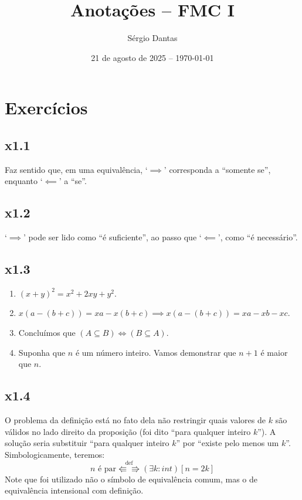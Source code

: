 \documentclass[portuguese,a4paper,12pt]{article}
\newcommand{\intiff}{\Lleftarrow\!\Rrightarrow}
\newcommand{\intdefiff}{\overset{\mathrm{def}}{\intiff}}
\begin{document}
	\title{Anotações -- FMC I}
	\author{Sérgio Dantas}
	\date{21 de agosto de 2025 -- \today}
	\maketitle
	
	\section*{\centering Exercícios}
	
	\subsection*{x1.1}
	
	Faz sentido que, em uma equivalência, `$\implies$' corresponda a ``somente se'', enquanto `$\impliedby$' a ``se''.
	 
	\subsection*{x1.2}
	
	`$\implies$' pode ser lido como ``é suficiente'', ao passo que `$\impliedby$', como ``é necessário''.
	
	\subsection*{x1.3}
	
	\begin{enumerate}[label=(\arabic*)]
		\item $(x + y)^2 = x^2 + 2xy + y^2$.
		\item $x(a - (b + c)) = xa - x(b + c) \implies x(a - (b + c)) = xa - xb - xc$.
		\item Concluímos que $(A \subseteq B) \iff (B \subseteq A)$.
		\item Suponha que $n$ é um número inteiro. Vamos demonstrar que $n + 1$ é maior que $n$.
	\end{enumerate}
	
	\subsection*{x1.4}
	
	O problema da definição está no fato dela não restringir quais valores de $k$ são válidos no lado direito da proposição (foi dito ``para qualquer inteiro $k$''). A solução seria substituir ``para qualquer inteiro $k$'' por ``existe pelo menos um $k$''. Simbologicamente, teremos:
	$$
	n \text{ é par} \intdefiff (\exists k: int)[n = 2k]
	$$
	Note que foi utilizado não o símbolo de equivalência comum, mas o de equivalência intensional com definição.
	
\end{document}
